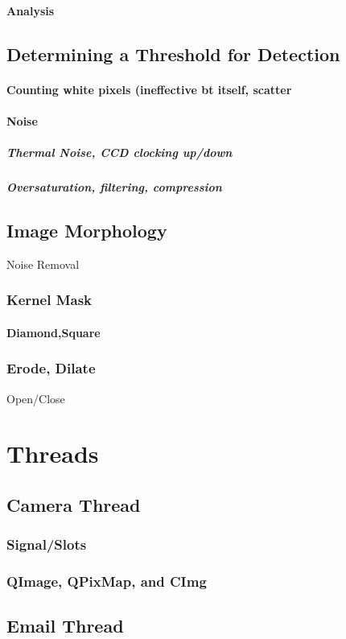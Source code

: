 \documentclass[11pt]{article} %
\begin{document}
\paragraph{Analysis}
\subsection{Determining a Threshold for Detection}
\paragraph{Counting white pixels (ineffective bt itself, scatter}
\paragraph{Noise}
\subparagraph{Thermal Noise, CCD clocking up/down}
\subparagraph{Oversaturation, filtering, compression}
\subsection{Image Morphology}{Noise Removal}
\subsubsection{Kernel Mask}
\paragraph{Diamond,Square}
\subsubsection{Erode, Dilate}{Open/Close}
\section{Threads}
\subsection{Camera Thread}
\subsubsection{Signal/Slots}
\subsubsection{QImage, QPixMap, and CImg}
\subsection{Email Thread}
\end{document}
